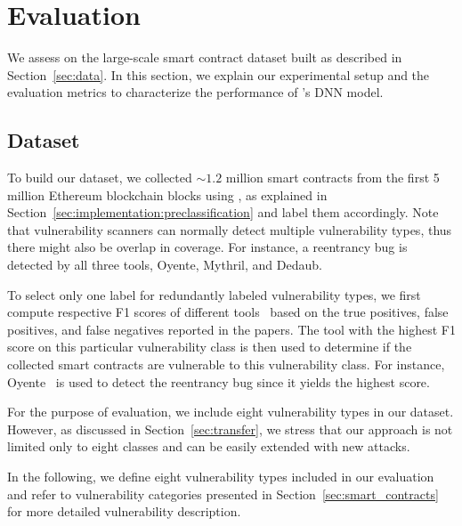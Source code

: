 \section{Evaluation}
\label{sec:evaluation}
We assess \sys{} on the large-scale smart contract dataset built as described in Section~\ref{sec:data}.
In this section, we explain our experimental setup and the evaluation metrics to characterize the performance of \sys{}'s DNN model.  

\vspace{-0.3em}
\subsection{Dataset}
\label{sec:evaluation:dataset}
To build our dataset, we collected $\sim1.2$ million smart contracts from the first 5 million Ethereum blockchain blocks using \datatool{}, as explained in Section~\ref{sec:implementation:preclassification} and label them accordingly. Note that vulnerability scanners can normally detect multiple vulnerability types, thus there might also be overlap in coverage. 
For instance, a reentrancy bug is detected by all three tools, Oyente, Mythril, and Dedaub.

To select only one label for redundantly labeled vulnerability types, we first compute respective F1 scores of different tools~\cite{metric_web} based on the true positives, false positives, and false negatives reported in the papers.
The tool with the highest F1 score on this particular vulnerability class is then used to determine if the collected smart contracts are vulnerable to this vulnerability class.
For instance, Oyente~\cite{rw_oyente_repo} is used to detect the reentrancy bug since it yields the highest score. 

For the purpose of evaluation, we include eight vulnerability types in our dataset. 
However, as discussed in Section~\ref{sec:transfer}, we stress that our approach is not limited only to eight classes and can be easily extended with new attacks. 

In the following, we define eight vulnerability types included in our evaluation and refer to vulnerability categories presented in Section~\ref{sec:smart_contracts} for more detailed vulnerability description. 

